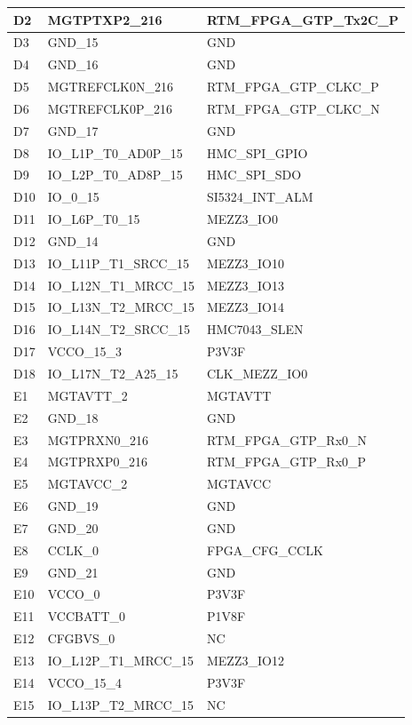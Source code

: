 \begin{footnotesize}
\begin{longtable}{|l|p{6cm}|p{6cm}|}
D2	&	MGTPTXP2\_216	&	RTM\_FPGA\_GTP\_Tx2C\_P	\\ \hline
D3	&	GND\_15	&	GND	\\ \hline
D4	&	GND\_16	&	GND	\\ \hline
D5	&	MGTREFCLK0N\_216	&	RTM\_FPGA\_GTP\_CLKC\_P	\\ \hline
D6	&	MGTREFCLK0P\_216	&	RTM\_FPGA\_GTP\_CLKC\_N	\\ \hline
D7	&	GND\_17	&	GND	\\ \hline
D8	&	IO\_L1P\_T0\_AD0P\_15	&	HMC\_SPI\_GPIO	\\ \hline
D9	&	IO\_L2P\_T0\_AD8P\_15	&	HMC\_SPI\_SDO	\\ \hline
D10	&	IO\_0\_15	&	SI5324\_INT\_ALM	\\ \hline
D11	&	IO\_L6P\_T0\_15	&	MEZZ3\_IO0	\\ \hline
D12	&	GND\_14	&	GND	\\ \hline
D13	&	IO\_L11P\_T1\_SRCC\_15	&	MEZZ3\_IO10	\\ \hline
D14	&	IO\_L12N\_T1\_MRCC\_15	&	MEZZ3\_IO13	\\ \hline
D15	&	IO\_L13N\_T2\_MRCC\_15	&	MEZZ3\_IO14	\\ \hline
D16	&	IO\_L14N\_T2\_SRCC\_15	&	HMC7043\_SLEN	\\ \hline
D17	&	VCCO\_15\_3	&	P3V3F	\\ \hline
D18	&	IO\_L17N\_T2\_A25\_15	&	CLK\_MEZZ\_IO0	\\ \hline
E1	&	MGTAVTT\_2	&	MGTAVTT	\\ \hline
E2	&	GND\_18	&	GND	\\ \hline
E3	&	MGTPRXN0\_216	&	RTM\_FPGA\_GTP\_Rx0\_N	\\ \hline
E4	&	MGTPRXP0\_216	&	RTM\_FPGA\_GTP\_Rx0\_P	\\ \hline
E5	&	MGTAVCC\_2	&	MGTAVCC	\\ \hline
E6	&	GND\_19	&	GND	\\ \hline
E7	&	GND\_20	&	GND	\\ \hline
E8	&	CCLK\_0	&	FPGA\_CFG\_CCLK	\\ \hline
E9	&	GND\_21	&	GND	\\ \hline
E10	&	VCCO\_0	&	P3V3F	\\ \hline
E11	&	VCCBATT\_0	&	P1V8F	\\ \hline
E12	&	CFGBVS\_0	&	NC	\\ \hline
E13	&	IO\_L12P\_T1\_MRCC\_15	&	MEZZ3\_IO12	\\ \hline
E14	&	VCCO\_15\_4	&	P3V3F	\\ \hline
E15	&	IO\_L13P\_T2\_MRCC\_15	&	NC	\\ \hline

\end{longtable}
\end{footnotesize}
